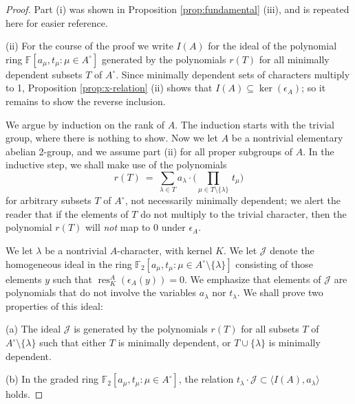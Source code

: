 \documentclass[10pt,a4paper]{amsart}
\DeclareMathOperator{\res}{res}
\newcommand{\Jc}{{\mathcal J}}
\newcommand{\mF}{{\mathbb F}}
\newcommand{\td}[1]{\langle #1\rangle}
\begin{document}
\begin{proof}
  Part (i) was shown in Proposition \ref{prop:fundamental} (iii),
  and is repeated here for easier reference.

  (ii)
  For the course of the proof we write $I(A)$ for the ideal of the polynomial ring 
  $\mF[a_\mu,t_\mu\colon \mu\in A^\circ]$ generated by the polynomials $r(T)$
  for all minimally dependent subsets $T$ of $A^\circ$. 
  Since minimally dependent sets of characters multiply to 1,
  Proposition \ref{prop:x-relation} (ii) shows that $I(A)\subseteq \ker(\epsilon_A)$;
  so it remains to show the reverse inclusion.

  We argue by induction on the rank of $A$.
  The induction starts with the trivial group, where there is nothing to show.
  Now we let $A$ be a nontrivial elementary abelian 2-group, and we assume part (ii)
  for all proper subgroups of $A$.
  In the inductive step, we shall make use of the polynomials
  \[  r(T)\ = \
    \sum_{\lambda\in T}  a_\lambda \cdot\bigg( \prod_{\mu\in T\setminus\{\lambda\}}\, t_\mu\bigg) \]
  for arbitrary subsets $T$ of $A^\circ$, not necessarily minimally dependent;
  we alert the reader that if the elements of $T$ do not multiply to the trivial character,
  then the polynomial $r(T)$ will {\em not} map to 0 under $\epsilon_A$.
  
  We let $\lambda$ be a nontrivial $A$-character, with kernel $K$.
  We let $\Jc$ denote the homogeneous ideal in the ring
  $\mF_2[a_\mu,t_\mu\colon  \mu\in A^\circ\setminus\{\lambda\}]$ consisting of those
  elements $y$ such that $\res^A_K(\epsilon_A(y))=0$.
  We emphasize that elements of $\Jc$ are polynomials that do not involve the variables
  $a_\lambda$ nor $t_\lambda$.
  We shall prove two properties of this ideal:\smallskip

  (a) The ideal $\Jc$ is generated by the polynomials $r(T)$ for all
  subsets $T$ of $A^\circ\setminus\{\lambda\}$
  such that either $T$ is minimally dependent, or $T\cup\{\lambda\}$
  is minimally dependent.\smallskip

  (b) In the graded ring   $\mF_2[a_\mu,t_\mu\colon  \mu\in A^\circ]$,
  the relation $t_\lambda\cdot \Jc\subset \td{I(A),a_\lambda}$ holds.\smallskip


\end{proof}
\end{document}
